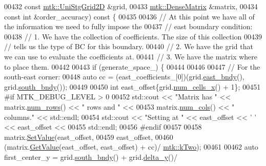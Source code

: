 \begin{DoxyCode}
00432     \textcolor{keyword}{const} \hyperlink{classmtk_1_1UniStgGrid2D}{mtk::UniStgGrid2D} &grid,
00433     \hyperlink{classmtk_1_1DenseMatrix}{mtk::DenseMatrix} &matrix,
00434     \textcolor{keyword}{const} \textcolor{keywordtype}{int} &order\_accuracy)\textcolor{keyword}{ const }\{
00435 
00436   \textcolor{comment}{// At this point we have all of the information we need to fully impose the}
00437   \textcolor{comment}{// east boundary condition:}
00438   \textcolor{comment}{// 1. We have the collection of coefficients. The size of this collection}
00439   \textcolor{comment}{// tells us the type of BC for this boundary.}
00440   \textcolor{comment}{// 2. We have the grid that we can use to evaluate the coefficients at.}
00441   \textcolor{comment}{// 3. We have the matrix where to place them.}
00442 
00443   \textcolor{keywordflow}{if} (generate\_space\_) \{
00444 
00446 
00447     \textcolor{comment}{// For the south-east corner:}
00448     \textcolor{keyword}{auto} cc = (east\_coefficients\_[0])(grid.\hyperlink{classmtk_1_1UniStgGrid2D_a03f689eb29a6369b82ce1207c655d5ff}{east\_bndy}(), grid.\hyperlink{classmtk_1_1UniStgGrid2D_a1442eaf219f099d0ebf46a170fdebf92}{south\_bndy}());
00449 
00450     \textcolor{keywordtype}{int} east\_offset\{grid.\hyperlink{classmtk_1_1UniStgGrid2D_a2d182866a398aba8e4829590e85bf939}{num\_cells\_x}() + 1\};
00451 \textcolor{preprocessor}{    #if MTK\_DEBUG\_LEVEL > 0}
00452     std::cout << \textcolor{stringliteral}{"Matrix has "} << matrix.\hyperlink{classmtk_1_1DenseMatrix_a53f3afb3b6a8d21854458aaa9663cc74}{num\_rows}() << \textcolor{stringliteral}{" rows and "} <<
00453       matrix.\hyperlink{classmtk_1_1DenseMatrix_a41747502d468c6728a4be31501b16e0e}{num\_cols}() << \textcolor{stringliteral}{" columns."} << std::endl;
00454     std::cout << \textcolor{stringliteral}{"Setting at "} << east\_offset << \textcolor{charliteral}{' '} << east\_offset <<
00455       std::endl;
00456 \textcolor{preprocessor}{    #endif}
00457 
00458     matrix.\hyperlink{classmtk_1_1DenseMatrix_a784ce5784109ac86bfb9d8562b334b13}{SetValue}(east\_offset,
00459                     east\_offset,
00460                     (matrix.\hyperlink{classmtk_1_1DenseMatrix_a4b23ecbebd970b5eea915dbb50691024}{GetValue}(east\_offset, east\_offset) + cc)/
      \hyperlink{group__c01-roots_gaf39c2d851a2db744f4feb1c5ab3ec2cf}{mtk::kTwo});
00461 
00462     \textcolor{keyword}{auto} first\_center\_y = grid.\hyperlink{classmtk_1_1UniStgGrid2D_a1442eaf219f099d0ebf46a170fdebf92}{south\_bndy}() + grid.\hyperlink{classmtk_1_1UniStgGrid2D_a65a78cfc80ffdbeb282ed57af4dc5cb4}{delta\_y}()/

\end{DoxyCode}
